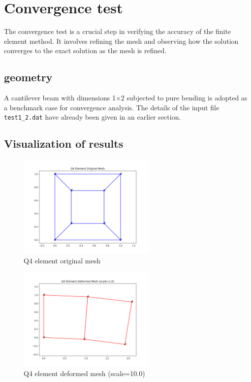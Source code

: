 \documentclass[a4paper,12pt]{report}
\begin{document}
\section{Convergence test}
The convergence test is a crucial step in verifying the accuracy of the finite element method. It involves refining the mesh and observing how the solution converges to the exact solution as the mesh is refined.

\subsection{geometry}
A cantilever beam with dimensions 1×2 subjected to pure bending is adopted as a benchmark case for convergence analysis.
The details of the input file \texttt{test1\_2.dat} have already been given in an earlier section.

\subsection{Visualization of results}

\begin{figure}[htbp]
    \centering
    \includegraphics[width=0.6\textwidth]{test_patch_original.png}
    \caption{Q4 element original mesh }
    \label{fig:patch1_2_original}
\end{figure}

\begin{figure}[htbp]
    \centering
    \includegraphics[width=0.6\textwidth]{test1_2_deformed.png}
    \caption{Q4 element deformed mesh (scale=10.0)}
    \label{fig:patch1_2_deform}
\end{figure}
\end{document}
